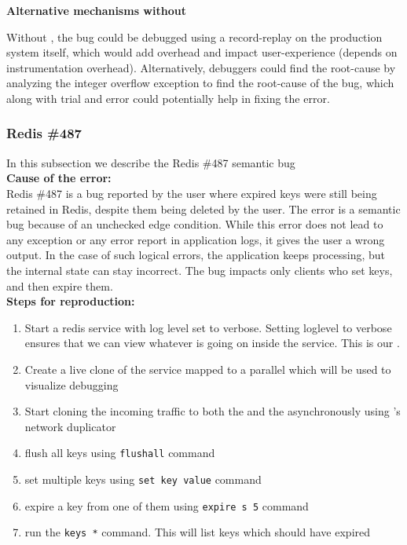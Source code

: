 \noindent \textbf{Alternative mechanisms without \parikshan}

Without \parikshan, the bug could be debugged using a record-replay on the production system itself, which would add overhead and impact user-experience (depends on instrumentation overhead). Alternatively, debuggers could find the root-cause by analyzing the integer overflow exception to find the root-cause of the bug, which along with trial and error could potentially help in fixing the error.


\subsubsection{Redis \#487}

In this subsection we describe the Redis \#487 semantic bug \\

\noindent \textbf{Cause of the error:} \\
Redis \#487 is a bug reported by the user where expired keys were still being retained in Redis, despite them being deleted by the user.
The error is a semantic bug because of an unchecked edge condition.
While this error does not lead to any exception or any error report in application logs, it gives the user a wrong output.
In the case of such logical errors, the application keeps processing, but the internal state can stay incorrect.
The bug impacts only clients who set keys, and then expire them.\\

\noindent \textbf{Steps for reproduction:} \\

\begin{adjustwidth}{0.5cm}{}
	\begin{enumerate}
			\item Start a redis service with log level set to verbose. Setting loglevel to verbose ensures that we can view whatever is going on inside the service. This is our \productioncontainer.
			\item Create a live clone of the service mapped to a parallel \debugcontainer which will be used to visualize debugging
			\item Start cloning the incoming traffic to both the \productioncontainer and the \debugcontainer asynchronously using \parikshan's network duplicator
			\item flush all keys using \texttt{flushall} command 
			\item set multiple keys using \texttt{set key value} command 
			\item expire a key from one of them using \texttt{expire s 5} command
			\item run the \texttt{keys *} command. This will list keys which should have expired
	\end{enumerate}

\end{adjustwidth}


